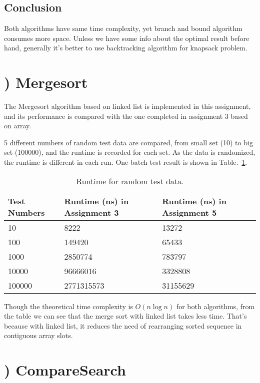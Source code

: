 \documentclass[natbib,12pt]{article}
\begin{document}
\subsection{Conclusion} 

Both algorithms have same time complexity, yet branch and bound algorithm consumes more space. Unless we have some info about the optimal result before hand, generally it's better to use backtracking algorithm for knapsack problem.


	\newpage
	\section{) Mergesort}
The Mergesort algorithm based on linked list is implemented in this assignment, and its performance is compared with the one completed in assignment 3 based on array.

5 different numbers of random test data are compared, from small set (10) to big set (100000), and the runtime is recorded for each set. As the data is randomized, the runtime is different in each run. One batch test result is shown in Table.~\ref{tab:randomTest}.

	\begin{table}[htpb]
	\centering
	\begin{tabular}{l|l|l}
		Test Numbers & Runtime (ns) in Assignment 3 & Runtime (ns) in Assignment 5 \\\hline
		10 & 8222  & 13272\\
		100 & 149420   & 65433 \\
		1000 & 2850774 & 783797 \\
		10000 & 96666016  & 3328808 \\
		100000 & 2771315573 & 31155629 
	\end{tabular}
	\caption{\label{tab:randomTest}Runtime for random test data.}
	\end{table}

Though the theoretical time complexity is  $O(n\log n)$ for both algorithms, from the table we can see that the merge sort with linked list takes less time. That's because with linked list, it reduces the need of rearranging sorted sequence in contiguous array slots.

	
\newpage
\section{) CompareSearch}
\end{document}
